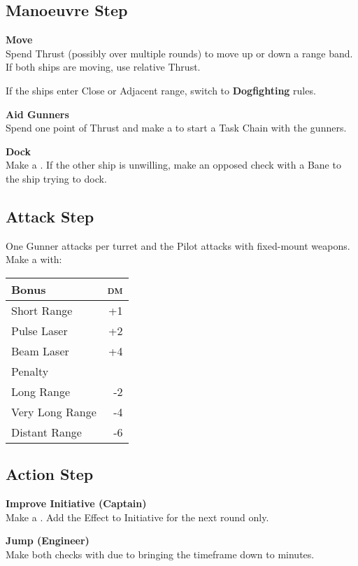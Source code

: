 \documentclass{cheatsheet}
\begin{document}
\begin{multicols}{3}
\subsection{Manoeuvre Step}

\textbf{Move}\\
Spend Thrust (possibly over multiple rounds) to move up or down a
range band.  If both ships are moving, use relative Thrust.

If the ships enter Close or Adjacent range, switch to
\textbf{Dogfighting} rules.

\textbf{Aid Gunners}\\
Spend one point of Thrust and make a 
to start a Task Chain with the gunners.

\textbf{Dock}\\
Make a .  If the other ship is
unwilling, make an opposed check with a Bane to the ship trying to
dock.

\subsection{Attack Step}

One Gunner attacks per turret and the Pilot attacks with fixed-mount
weapons.  Make a  with:

\begin{tabularx}{\linewidth}{Xr} \toprule
  Bonus & \textsc{dm} \\ \midrule
  Short Range & +1 \\
  Pulse Laser & +2 \\
  Beam Laser & +4 \\ \midrule
  Penalty & \\ \midrule
  Long Range & -2 \\
  Very Long Range & -4 \\
  Distant Range & -6 \\ \bottomrule
\end{tabularx}

\subsection{Action Step}

\textbf{Improve Initiative (Captain)}\\
Make a .  Add the Effect to Initiative for the
next round only.

\textbf{Jump (Engineer)}\\
Make both checks with  due to bringing the timeframe down
to  minutes.


\end{multicols}
\end{document}
